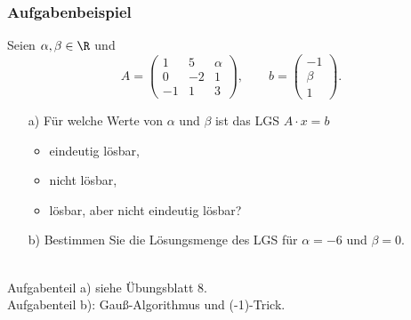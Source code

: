 \begin{frame}\frametitle{Aufgabenbeispiel}
Seien $\alpha,\beta \in \R$ und
$$
	A =
	\begin{pmatrix}
		1	&5	&\alpha	\\
		0	&-2	&1	\\
		-1	&1	&3
	\end{pmatrix},
	\qquad
	b =
	\begin{pmatrix}
		-1	\\
		\beta	\\
		1
	\end{pmatrix}.
$$
\begin{itemize}
\item[a)]  F\"ur welche Werte von $\alpha$ und $\beta$ ist das LGS $A\cdot x = b$
\begin{itemize}
	\item eindeutig l\"osbar,
	\item nicht l\"osbar,
	\item l\"osbar, aber nicht eindeutig l\"osbar?
\end{itemize}
	\item[b)] Bestimmen Sie die Lösungsmenge des LGS für $\alpha=-6$ und $\beta=0$.
\end{itemize}
\pause
{}\\
Aufgabenteil a) siehe Übungsblatt 8.\\
Aufgabenteil b): Gauß-Algorithmus und (-1)-Trick.
\end{frame}
%
